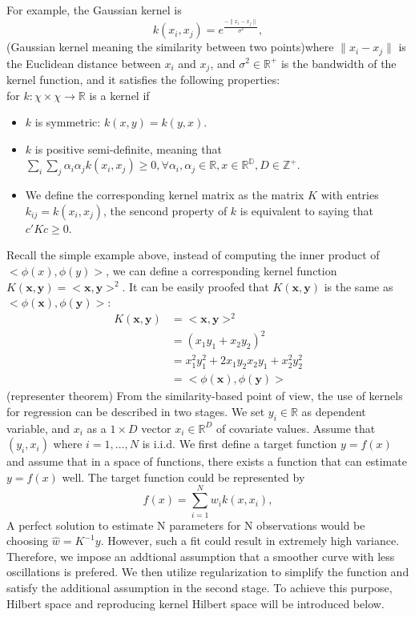 For example, the Gaussian kernel is
\begin{equation}
    k(x_i, x_j) = e^\frac{-\parallel x_i - x_j \parallel}{\sigma^2},
\end{equation}
(Gaussian kernel meaning the similarity between two points)where $\parallel x_i - x_j \parallel$ is the Euclidean distance between $x_i$ and $x_j$, and $\sigma^2 \in \mathbb{R}^+$ is the bandwidth of the kernel function, and it satisfies the 
following properties:\\
for $k: \chi \times \chi \rightarrow \mathbb{R}$ is a kernel if
\begin{itemize}
    \item $k$ is symmetric: $k(x,y) = k(y,x)$.
    \item $k$ is positive semi-definite, meaning that $\sum_{i} \sum_{j} \alpha_i \alpha_j k(x_i,x_j)\geq0, \forall \alpha_i, \alpha_j \in \mathbb{R}, x \in \mathbb{R}^\mathbb{D}, D \in \mathbb{Z}^+$. 
    \item We define the corresponding kernel matrix as the matrix $K$ with entries $k_{ij}=k(x_i,x_j)$, the sencond property of $k$ is equivalent to saying that $c'Kc \geq0$.
\end{itemize}
Recall the simple example above, instead of computing the inner product of $<\phi(x),\phi(y)>$, we can define 
a corresponding kernel function $K(\textbf{x},\textbf{y})=<\textbf{x},\textbf{y}>^2$. It can be easily proofed that $K(\textbf{x},\textbf{y})$ is the same as $<\phi(\textbf{x}),\phi(\textbf{y})>$:
\begin{align*}
    K(\textbf{x},\textbf{y})&=<\textbf{x},\textbf{y}>^2\\
                            &=(x_1y_1+x_2y_2)^2\\
                            &=x_1^2y_1^2+2x_1y_2x_2y_1+x_2^2y_2^2\\
                            &=<\phi(\textbf{x}),\phi(\textbf{y})>
\end{align*}
(representer theorem)
From the similarity-based point of view, the use of kernels for regression can be described in two stages. We set $y_i \in \mathbb{R}$ as dependent variable, 
and $x_i$ as a $1 \times D$ vector $x_i \in \mathbb{R}^D$ of covariate values. Assume that $(y_i, x_i)$ where $i = 1, \dots, N$ is i.i.d. We first define a target function $y=f(x)$ and assume that in a space of functions, there exists 
a function that can estimate $y=f(x)$ well. The target function could be represented by
\begin{equation}
    f(x)= \sum_{i=1}^N w_i k(x,x_i),
\end{equation}
A perfect solution to estimate N parameters for N observations would be choosing $\hat{w}=K^{-1}y$. However, such a fit could result in extremely high variance. Therefore, we impose an addtional assumption 
that a smoother curve with less oscillations is prefered. We then utilize regularization to simplify the function and satisfy the additional assumption in 
the second stage. To achieve this purpose, Hilbert space and reproducing kernel Hilbert space will be introduced below.



